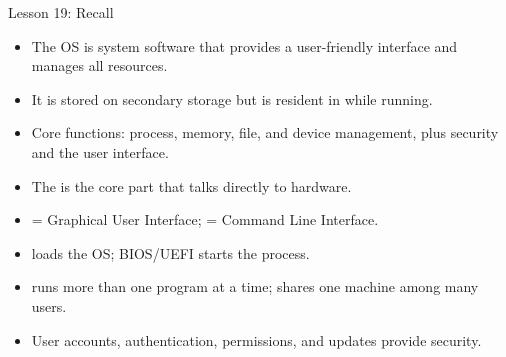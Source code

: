 \documentclass[aspectratio=169]{beamer}
\begin{document}
\begin{frame}{Lesson 19: Recall}
  \begin{itemize}
    \item The OS is system software that provides a user-friendly interface
      and manages all resources.
    \item It is stored on secondary storage but is resident in  while running.
    \item Core functions: process, memory, file, and device management, plus
      security and the user interface.
    \item The  is the core part that talks directly to hardware.
    \item {} = Graphical User Interface;  = Command Line
      Interface.
    \item {} loads the OS; BIOS/UEFI starts the process.
    \item {} runs more than one program at a time;
       shares one machine among many users.
    \item User accounts, authentication, permissions, and updates provide
      security.
  \end{itemize}
\end{frame}
\end{document}
